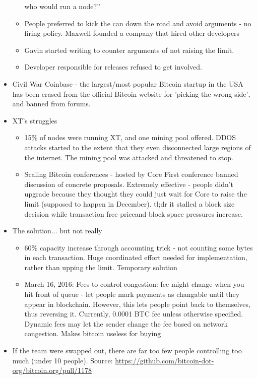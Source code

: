 \documentclass{article}
\begin{document}
\begin{itemize}
\begin{itemize}
        who would run a node?''
      \item People preferred to kick the can down the road and avoid arguments - no firing policy. Maxwell founded a company that hired other developers
      \item Gavin started writing to counter arguments of not raising the limit.
      \item Developer responsible for releases refused to get involved.
    \end{itemize}
  \item Civil War
    \subitem Coinbase - the largest/most popular Bitcoin startup in the USA has been erased from the official Bitcoin website for
    'picking the wrong side', and banned from forums.
  \item XT's struggles
    \begin{itemize}
      \item 15\% of nodes were running XT, and one mining pool offered. DDOS attacks started to the extent that
        they even disconnected large regions of the internet. The mining pool was attacked and threatened to stop.
      \item Scaling Bitcoin conferences - hosted by Core
        \subitem First conference banned discussion of concrete proposals.
        \subitem Extremely effective - people didn't upgrade because they thought they could just wait for Core to raise the limit (supposed to
        happen in December).
        \subitem tl;dr it stalled a block size decision while transaction free priceand block space pressures increase.
    \end{itemize}
  \item The solution... but not really
    \begin{itemize}
      \item 60\% capacity increase through accounting trick - not counting some bytes in each transaction.
        \subitem Huge coordinated effort needed for implementation, rather than upping the limit.
        \subitem Temporary solution
      \item March 16, 2016: Fees to control congestion: fee might change when you hit front of queue - let people mark payments as
        changable until they appear in blockchain. However, this lets people point back to themselves, thus reversing it.
        \subitem Currently, 0.0001 BTC fee unless otherwise specified. Dynamic fees may let the sender change the fee based on network congestion.
        \subitem Makes bitcoin useless for buying
    \end{itemize}
  \item If the team were swapped out, there are far too few people controlling too much (under 10 people).
  Source: \url{https://github.com/bitcoin-dot-org/bitcoin.org/pull/1178}


\end{itemize}
\end{document}
